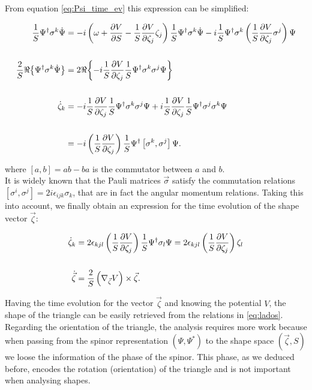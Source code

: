 From equation \eqref{eq:Psi_time_ev} this expression can be simplified:

\begin{align*}
\frac{1}{S}\Psi^{\dagger}\sigma^k\dot{\Psi} &= -i\left( \omega +\frac{\partial V}{\partial S}- \frac{1}{S}\frac{\partial V}{\partial \zeta_j}\zeta_j  \right)\frac{1}{S}\Psi^{\dagger}\sigma^k\dot{\Psi} -i\frac{1}{S}\Psi^{\dagger}\sigma^k\left( \frac{1}{S}\frac{\partial V}{\partial \zeta_j}\sigma^j \right)\Psi\\
\\
\frac{2}{S}\Re{\left\{\Psi^{\dagger}\sigma^k\dot{\Psi}\right\}} &= 2\Re{\left\{-i\frac{1}{S}\frac{\partial V}{\partial \zeta_j}\frac{1}{S}\Psi^{\dagger}\sigma^k\sigma^j\Psi\right\}}\\
\\
\dot{\zeta}_k &= -i\frac{1}{S}\frac{\partial V}{\partial \zeta_j}\frac{1}{S}\Psi^{\dagger}\sigma^k\sigma^j\Psi +i\frac{1}{S}\frac{\partial V}{\partial \zeta_j}\frac{1}{S}\Psi^{\dagger}\sigma^j\sigma^k\Psi\\
\\
&= -i\left( \frac{1}{S}\frac{\partial V}{\partial \zeta_j} \right)\frac{1}{S}\Psi^{\dagger}\left[\sigma^k,\sigma^j\right]\Psi.
\end{align*}

where $[a,b] = ab-ba$ is the commutator between $a$ and $b$. \\

It is widely known that the Pauli matrices $\vec{\sigma}$ satisfy the commutation relations $[\sigma^i,\sigma^j] = 2i\epsilon_{ijk}\sigma_k$, that are in fact  the angular momentum relations. Taking this into account, we finally obtain an expression for the time evolution of the shape vector $\vec{\zeta}$:

\begin{align}
\dot{\zeta}_k &= 2\epsilon_{kjl}\left( \frac{1}{S}\frac{\partial V}{\partial \zeta_j} \right)\frac{1}{S}\Psi^{\dagger}\sigma_l\Psi =  2\epsilon_{kjl}\left( \frac{1}{S}\frac{\partial V}{\partial \zeta_j} \right)\zeta_l \nonumber \\ 
\nonumber \\ 
\dot{\vec{\zeta}} &= \frac{2}{S}\left( \nabla_{\vec{\zeta}}V \right)\times\vec{\zeta}. 
\end{align}

Having the time evolution for the vector $\vec{\zeta}$ and knowing the potential $V$, the shape of the triangle can be easily retrieved from the relations in \eqref{eq:lados}. Regarding the orientation of the triangle, the analysis requires more work because when passing from the spinor representation $(\Psi,\Psi^*)$ to the shape space $(\vec{\zeta},S)$ we loose the information of the phase of the spinor. This phase, as we deduced before, encodes the rotation (orientation) of the triangle and is not important when analysing shapes.\\

